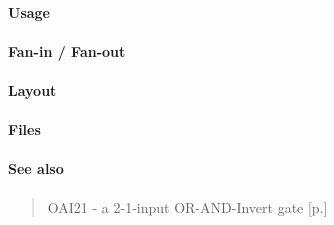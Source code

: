 \paragraph{Usage}

\paragraph{Fan-in / Fan-out}

\paragraph{Layout}

\paragraph{Files}

\paragraph{See also}
\begin{quote}
    OAI21 - a 2-1-input OR-AND-Invert gate [p.\pageref{OAI21}]
\end{quote}
